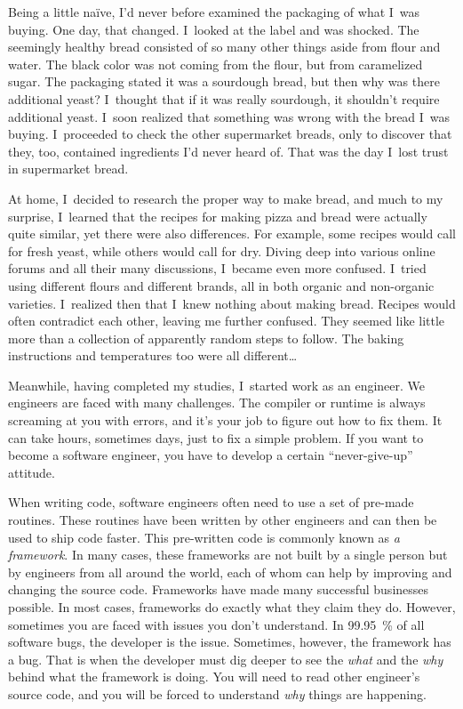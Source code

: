 Being a little naïve, I'd never before examined the packaging of what I~was
buying. One day, that changed.  I~looked at the label and was shocked. The
seemingly
healthy bread consisted of so many other things aside from flour and water.
The black color was not coming from the flour, but from caramelized sugar.
The packaging stated it was a sourdough bread, but then why was there additional yeast?
I~thought that if it was really sourdough, it shouldn't require additional
yeast. I~soon
realized that something was wrong with the bread I~was buying.
I~proceeded to check the other supermarket breads, only to discover that they, too,
contained ingredients I'd never heard of. That was the day I~lost trust
in supermarket bread.

At home, I~decided to research the proper way to make bread, and much to my surprise,
I~learned that the recipes for making pizza and bread were actually quite similar, yet
there were also differences. For example, some recipes would call for fresh yeast, while
others would call for dry. Diving deep into various online forums and all their many
discussions, I~became even more confused.
I~tried using different flours and different brands, all in both organic and non-organic varieties.
I~realized then that I~knew nothing about making bread. Recipes would often contradict each other,
leaving me further confused. They seemed like little more than a collection of apparently random
steps to follow. The baking instructions and temperatures too were all
different\dots

Meanwhile, having completed my studies, I~started work as an engineer.
We engineers are faced with many challenges. The compiler or runtime is
always screaming at you with errors, and it's your job to figure out how to fix them.
It can take hours, sometimes days, just to fix a simple problem. If you want
to become a software engineer, you have to develop a certain ``never-give-up'' attitude.

When writing code, software engineers often need to use a set of pre-made routines. These routines have been
written by other engineers and can then be used to ship code faster.
This pre-written code is commonly known as \emph{a framework}. In many cases,
these frameworks are not built by a single person but by engineers from all around the world,
each of whom can help by improving and changing the source code. Frameworks have made many successful
businesses possible.
In most cases, frameworks do exactly what they claim they do. However,
sometimes you are faced with issues you don't understand. In \qty{99.95}{\percent}
of all software bugs, the developer is the issue. Sometimes, however, the framework has a
bug. That is when the developer must dig deeper to see the \emph{what} and the
\emph{why} behind what
the framework is doing. You will need to read other engineer's source code, and you will be forced
to understand \emph{why} things are happening.


